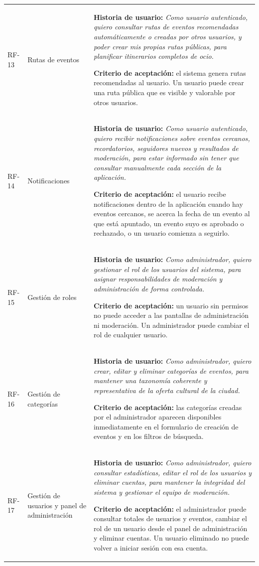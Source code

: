 {\begin{longtable}{@{}>{\raggedright\arraybackslash}p{} >{\raggedright\arraybackslash}p{} >{\raggedright\arraybackslash}p{}@{}}
\addlinespace
RF-13 & Rutas de eventos & \textbf{Historia de usuario:} \textit{Como usuario autenticado, quiero consultar rutas de eventos recomendadas automáticamente o creadas por otros usuarios, y poder crear mis propias rutas públicas, para planificar itinerarios completos de ocio.}\par\vspace{0.05cm}\textbf{Criterio de aceptación:} el sistema genera rutas recomendadas al usuario. Un usuario puede crear una ruta pública que es visible y valorable por otros usuarios. \\
\addlinespace
RF-14 & Notificaciones & \textbf{Historia de usuario:} \textit{Como usuario autenticado, quiero recibir notificaciones sobre eventos cercanos, recordatorios, seguidores nuevos y resultados de moderación, para estar informado sin tener que consultar manualmente cada sección de la aplicación.}\par\vspace{0.05cm}\textbf{Criterio de aceptación:} el usuario recibe notificaciones dentro de la aplicación cuando hay eventos cercanos, se acerca la fecha de un evento al que está apuntado, un evento suyo es aprobado o rechazado, o un usuario comienza a seguirlo. \\
\addlinespace
RF-15 & Gestión de roles & \textbf{Historia de usuario:} \textit{Como administrador, quiero gestionar el rol de los usuarios del sistema, para asignar responsabilidades de moderación y administración de forma controlada.}\par\vspace{0.05cm}\textbf{Criterio de aceptación:} un usuario sin permisos no puede acceder a las pantallas de administración ni moderación. Un administrador puede cambiar el rol de cualquier usuario. \\
\addlinespace
RF-16 & Gestión de categorías & \textbf{Historia de usuario:} \textit{Como administrador, quiero crear, editar y eliminar categorías de eventos, para mantener una taxonomía coherente y representativa de la oferta cultural de la ciudad.}\par\vspace{0.05cm}\textbf{Criterio de aceptación:} las categorías creadas por el administrador aparecen disponibles inmediatamente en el formulario de creación de eventos y en los filtros de búsqueda. \\
\addlinespace
RF-17 & Gestión de usuarios y panel de administración & \textbf{Historia de usuario:} \textit{Como administrador, quiero consultar estadísticas, editar el rol de los usuarios y eliminar cuentas, para mantener la integridad del sistema y gestionar el equipo de moderación.}\par\vspace{0.05cm}\textbf{Criterio de aceptación:} el administrador puede consultar totales de usuarios y eventos, cambiar el rol de un usuario desde el panel de administración y eliminar cuentas. Un usuario eliminado no puede volver a iniciar sesión con esa cuenta. \\

\end{longtable}}
